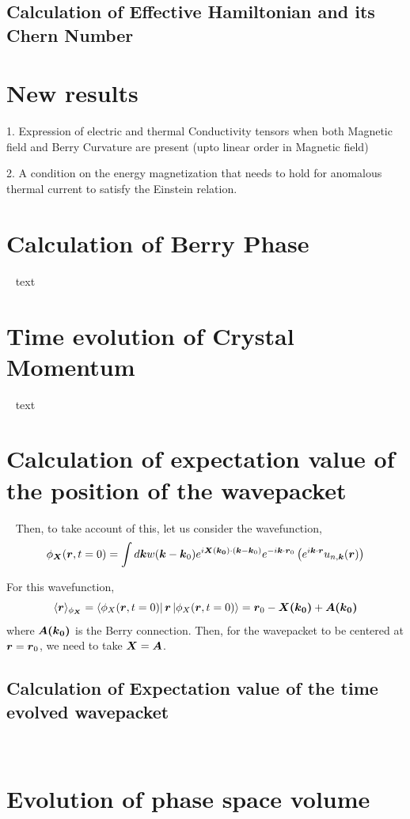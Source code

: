 \documentclass{revtex4-2}
\renewcommand\vec[1]{\ensuremath\boldsymbol{#1}} %
\begin{document}
\subsection{Calculation of Effective Hamiltonian and its Chern Number}

\section{New results}
1. Expression of electric and thermal Conductivity tensors when both Magnetic field and Berry Curvature are present (upto linear order in Magnetic field)

2. A condition on the energy magnetization that needs to hold for anomalous thermal current to satisfy the Einstein relation.
\appendix
\section{Calculation of Berry Phase}~\label{app:BerryPhase}
text
\section{Time evolution of Crystal Momentum}~\label{app:crystal-momentum-time-evolution}
text
\section{Calculation of expectation value of the position of the wavepacket}~\label{app:center-at-zero-time}
Then, to take account of this, let us consider the wavefunction, $$\phi_{\vec{X}}(\vec{r}, t=0) = \int d\vec{k} w(\vec{k} - \vec{k}_0) e^{i \vec{X}(\vec{k_0})\cdot (\vec{k} - \vec{k}_0)} e^{-i \vec{k} \cdot \vec{r}_0 } \left(e^{i \vec{k} \cdot\vec{r}} u_{n,\vec{k}}(\vec{r})\right)$$

For this wavefunction,
$$\langle \vec{r} \rangle_{\phi_{\vec{X}}} = \bra{\phi_X(\vec{r}, t=0)} \vec{r} \ket{\phi_X(\vec{r}, t=0)} = \vec{r}_0 - \vec{X(\vec{k}_0)} + \vec{A(\vec{k}_0)} $$
where  $\vec{A(\vec{k}_0)}$ is the Berry connection. Then, for the wavepacket to be centered at $\vec{r} = \vec{r}_0$, we need to take $\vec{X} = \vec{A}$.
\subsection{Calculation of Expectation value of the time evolved wavepacket}~\label{app:center-at-new-time}
\section{Evolution of phase space volume}~\label{app:phase-space-volume-evolution}
\end{document}
